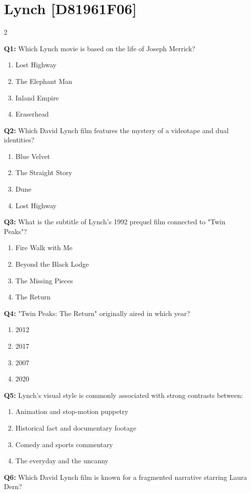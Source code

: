 \documentclass[10pt]{article}
\begin{document}
\newpage

\section*{Lynch \footnotesize [D81961F06]}
\begin{multicols}{2}

\textbf{Q1:} Which Lynch movie is based on the life of Joseph Merrick?

\begin{enumerate}[label=\arabic*.]
\item Lost Highway
\item The Elephant Man
\item Inland Empire
\item Eraserhead
\end{enumerate}
\textbf{Q2:} Which David Lynch film features the mystery of a videotape and dual identities?

\begin{enumerate}[label=\arabic*.]
\item Blue Velvet
\item The Straight Story
\item Dune
\item Lost Highway
\end{enumerate}
\textbf{Q3:} What is the subtitle of Lynch's 1992 prequel film connected to "Twin Peaks"?

\begin{enumerate}[label=\arabic*.]
\item Fire Walk with Me
\item Beyond the Black Lodge
\item The Missing Pieces
\item The Return
\end{enumerate}
\textbf{Q4:} "Twin Peaks: The Return" originally aired in which year?

\begin{enumerate}[label=\arabic*.]
\item 2012
\item 2017
\item 2007
\item 2020
\end{enumerate}
\textbf{Q5:} Lynch's visual style is commonly associated with strong contrasts between:

\begin{enumerate}[label=\arabic*.]
\item Animation and stop-motion puppetry
\item Historical fact and documentary footage
\item Comedy and sports commentary
\item The everyday and the uncanny
\end{enumerate}
\textbf{Q6:} Which David Lynch film is known for a fragmented narrative starring Laura Dern?


\end{multicols}
\end{document}

